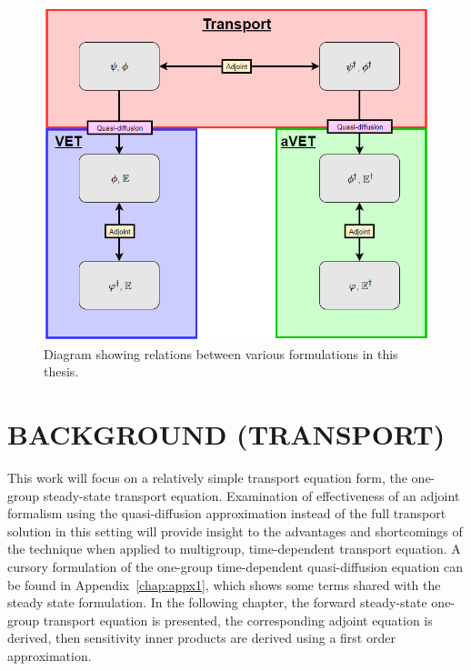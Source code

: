 \documentclass[12pt]{report}
\begin{document}
\begin{figure}[H]
\centering
  \includegraphics[scale=0.6]{figures2/RoadMap.png}
  \caption{Diagram showing relations between various formulations in this thesis.}
  \label{fig:roadmap}
\end{figure}


\chapter{\uppercase {Background (Transport)}} \label{chap:background}

This work will focus on a relatively simple transport equation form, the one-group steady-state transport equation. Examination of effectiveness of an adjoint formalism using the quasi-diffusion approximation instead of the full transport solution in this setting will provide insight to the advantages and shortcomings of the technique when applied to multigroup, time-dependent transport equation. A cursory formulation of the one-group time-dependent quasi-diffusion equation can be found in Appendix~\ref{chap:appx1}, which shows some terms shared with the steady state formulation. In the following chapter, the forward steady-state one-group transport equation is presented, the corresponding adjoint equation is derived, then sensitivity inner products are derived using a first order approximation. 
\end{document}
